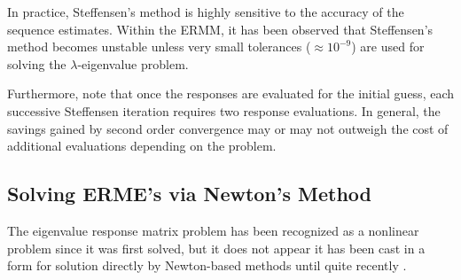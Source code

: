 In practice, Steffensen's method is highly sensitive to the 
accuracy of the sequence estimates.  Within the ERMM, it
has been observed that Steffensen's method becomes unstable
unless very small tolerances ($\approx 10^{-9}$) are used 
for solving the $\lambda$-eigenvalue problem.

Furthermore, note that once the responses are evaluated for the initial
guess, each successive Steffensen iteration requires two response 
evaluations.  In general, the savings gained by second order convergence 
may or may not outweigh the cost of additional evaluations depending 
on the problem.


\subsection{Solving ERME's via Newton's Method}
\label{sec:newtonsmethod}


The eigenvalue response matrix problem has been recognized as a 
nonlinear problem since it was first solved, but it does not 
appear it has been cast in a form for solution directly by 
Newton-based methods until quite recently \cite{roberts2010ncm}.  



